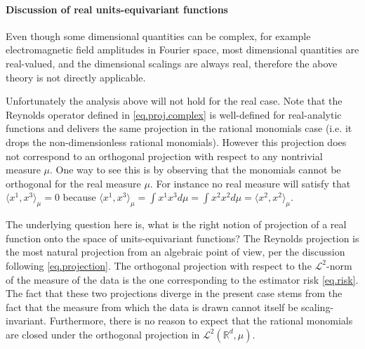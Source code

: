 \documentclass[twoside,11pt]{article}
\begin{document}

\paragraph{Discussion of real units-equivariant functions}
Even though some dimensional quantities can be complex, for example electromagnetic field amplitudes in Fourier space, most dimensional quantities are real-valued, and the dimensional scalings are always real, therefore the above theory is not directly applicable.

Unfortunately the analysis above will not hold for the real case. Note that the Reynolds operator defined in \eqref{eq.proj.complex} is well-defined for real-analytic functions and delivers the same projection in the rational monomials case (i.e. it drops the non-dimensionless rational monomials). However this projection does not correspond to an orthogonal projection with respect to any nontrivial measure $\mu$. One way to see this is by observing that the monomials cannot be orthogonal for the real measure $\mu$. For instance no real measure will satisfy that $\langle x^1, x^3 \rangle_\mu =0$ because $\langle x^1, x^3 \rangle_\mu = \int x^1 x^3 d\mu = \int x^2 x^2 d\mu = \langle x^2, x^2 \rangle_\mu$. 

The underlying question here is, what is the right notion of projection of a real function onto the space of units-equivariant functions?
The Reynolds projection is the most natural projection from an algebraic point of view, per the discussion following \eqref{eq.projection}.
The orthogonal projection with respect to the $\mathscr L^2$-norm of the measure of the data is the one corresponding to the estimator risk \eqref{eq.risk}. The fact that these two projections diverge in the present case stems from the fact that the measure from which the data is drawn cannot itself be scaling-invariant. Furthermore, there is no reason to expect that the rational monomials are closed under the orthogonal projection in $\mathscr L^2(\mathbb R^d, \mu)$.
\end{document}
